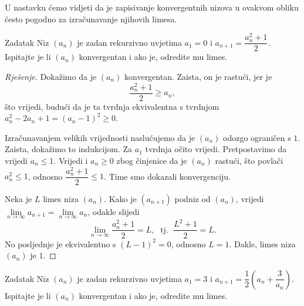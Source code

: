 U nastavku ćemo vidjeti da je zapisivanje konvergentnih nizova u ovakvom obliku često pogodno za izračunavanje njihovih limesa.
\begin{exercise}{Zadatak}
Niz \((a_n)\) je zadan rekurzivno uvjetima \(a_1=0\) i \(a_{n+1}=\dfrac{a_n^2+1}{2}\). Ispitajte je li \((a_n)\) konvergentan i ako je, odredite mu limes.
\end{exercise}
\begin{proof}[Rješenje]
Dokažimo da je \((a_n)\) konvergentan. Zaista, on je rastući, jer je 
\[\dfrac{a_n^2+1}{2}\geq a_n,\]
što vrijedi, budući da je ta tvrdnja ekvivalentna s tvrdnjom \(a_n^2-2a_n+1=(a_n-1)^2\geq 0\). 

Izračunavanjem velikih vrijednosti naslućujemo da je \((a_n)\) odozgo ograničen s \(1\). Zaista, dokažimo to indukcijom. Za \(a_1\) tvrdnja očito vrijedi. Pretpostavimo da vrijedi \(a_n\leq 1\). Vrijedi i \(a_n\geq 0\) zbog činjenice da je \((a_n)\) rastući, što povlači \(a_n^2\leq 1\), odnosno \(\dfrac{a_n^2+1}{2}\leq 1\). Time smo dokazali konvergenciju. 

Neka je \(L\) limes niza \((a_n)\). Kako je \((a_{n+1})\) podniz od \((a_n)\), vrijedi \(\lim\limits_{n\to \infty}{a_{n+1}}=\lim\limits_{n\to \infty}{a_n}\), odakle slijedi
\[\lim\limits_{n\to \infty}{\dfrac{a_n^2+1}{2}}=L,\;\text{ tj. }\; \dfrac{L^2+1}{2}=L.\]
No posljednje je ekvivalentno s \((L-1)^2=0\), odnosno \(L=1\). Dakle, limes niza \((a_n)\) je \(1\).
\end{proof}
\begin{exercise}{Zadatak}
Niz \((a_n)\) je zadan rekurzivno uvjetima \(a_1=3\) i \(a_{n+1}=\dfrac{1}{2}\left(a_n+\dfrac{3}{a_n}\right)\). Ispitajte je li \((a_n)\) konvergentan i ako je, odredite mu limes.
\end{exercise}
